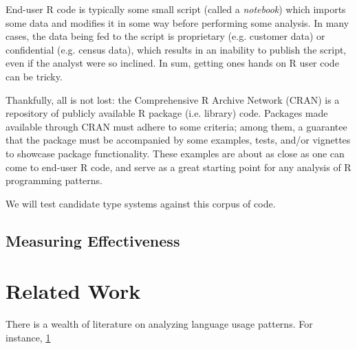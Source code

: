 \documentclass[sigplan,10pt,review,anonymous]{acmart}\settopmatter{printfolios=true,printccs=false,printacmref=false}
\begin{document}
End-user R code is typically some small script (called a {\it notebook}) which imports some data and modifies it in some way before performing some analysis.
In many cases, the data being fed to the script is proprietary (e.g. customer data) or confidential (e.g. census data), which results in an inability to publish the script, even if the analyst were so inclined.
In sum, getting ones hands on R user code can be tricky.

Thankfully, all is not lost: the Comprehensive R Archive Network (CRAN) is a repository of publicly available R package (i.e. library) code.
Packages made available through CRAN must adhere to some criteria; among them, a guarantee that the package must be accompanied by some examples, tests, and/or vignettes to showcase package functionality.
These examples are about as close as one can come to end-user R code, and serve as a great starting point for any analysis of R programming patterns.

We will test candidate type systems against this corpus of code.

%
%
\subsection{Measuring Effectiveness}



%
%
%
%
\section{Related Work}

There is a wealth of literature on analyzing language usage patterns.
For instance, \ref{}

%
%
%


\end{document}
